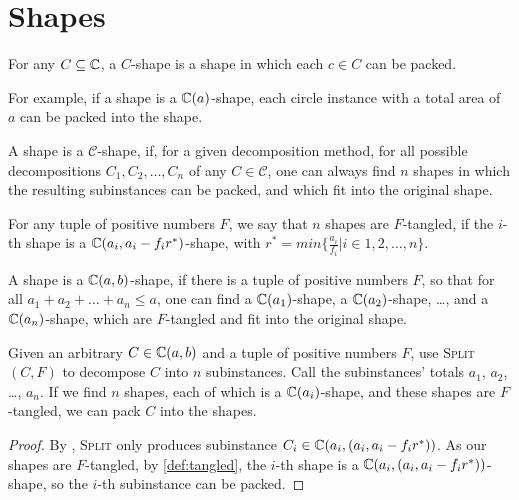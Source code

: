 \documentclass[%
    a4paper,              %
    style=print,          %
    bibliography=totoc,   %
    nexus,                %
    lnum,                 %
    extramargin,          %
]{tubsbook}
\begin{document}
\section{Shapes}

\begin{definition}
    For any $C \subseteq \mathbb{C}$, a $C$-shape is a shape in which each $c \in C$ can be packed.
\end{definition}

For example, if a shape is a $\mathbb{C}(a)$-shape, each circle instance with a total area of $a$ can be packed into the shape.

\begin{theorem}
    A shape is a $\mathcal{C}$-shape, if, for a given decomposition method, for all possible decompositions $C_1, C_2, \dots, C_n$ of any $C \in \mathcal{C}$, one can always find $n$ shapes in which the resulting subinstances can be packed, and which fit into the original shape.
\end{theorem}

\begin{definition}\label{def:tangled}
    For any tuple of positive numbers $F$, we say that $n$ shapes are $F$-tangled, if the $i$-th shape is a $\mathbb{C}(a_i, a_i - f_i r^*)$-shape, with $r^* = min\{\frac{a_i}{f_i}|i \in 1,2,\dots,n\}$.
\end{definition}

\begin{theorem}
    A shape is a $\mathbb{C}(a,b)$-shape, if there is a tuple of positive numbers $F$, so that for all $a_1 + a_2 + \dots + a_n \le a$, one can find a $\mathbb{C}(a_1)$-shape, a $\mathbb{C}(a_2)$-shape, \dots, and a $\mathbb{C}(a_n)$-shape, which are $F$-tangled and fit into the original shape.
\end{theorem}

\begin{theorem}\label{th:split-tangle}
    Given an arbitrary $C \in \mathbb{C}(a,b)$ and a tuple of positive numbers $F$, use \textsc{Split}$(C,F)$ to decompose $C$ into $n$ subinstances. Call the subinstances' totals $a_1$, $a_2$, \dots, $a_n$. If we find $n$ shapes, each of which is a $\mathbb{C}(a_i)$-shape, and these shapes are $F$-tangled, we can pack $C$ into the shapes.
\end{theorem}

\begin{proof}
    By , \textsc{Split} only produces subinstance $C_i \in \mathbb{C}(a_i, (a_i, a_i-f_i r^*))$.
    As our shapes are $F$-tangled, by \cref{def:tangled}, the $i$-th shape is a $\mathbb{C}(a_i, (a_i, a_i - f_i r^*))$-shape, so the $i$-th subinstance can be packed.
\end{proof}
\end{document}
